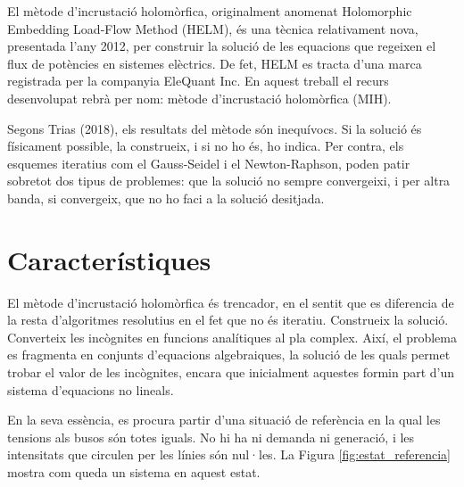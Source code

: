 El mètode d'incrustació holomòrfica, originalment anomenat Holomorphic Embedding Load-Flow Method (HELM), és una tècnica relativament nova, presentada l'any 2012, per construir la solució de les equacions que regeixen el flux de potències en sistemes elèctrics. De fet, HELM es tracta d'una marca registrada per la companyia EleQuant Inc. En aquest treball el recurs desenvolupat rebrà per nom: mètode d'incrustació holomòrfica (MIH).

Segons Trias (2018), els resultats del mètode són inequívocs. Si la solució és físicament possible, la construeix, i si no ho és, ho indica. Per contra, els esquemes iteratius com el Gauss-Seidel i el Newton-Raphson, poden patir sobretot dos tipus de problemes: que la solució no sempre convergeixi, i per altra banda, si convergeix, que no ho faci a la solució desitjada. 

\section{Característiques}
El mètode d'incrustació holomòrfica és trencador, en el sentit que es diferencia de la resta d'algoritmes resolutius en el fet que no és iteratiu. Construeix la solució. Converteix les incògnites en funcions analítiques al pla complex. Així, el problema es fragmenta en conjunts d'equacions algebraiques, la solució de les quals permet trobar el valor de les incògnites, encara que inicialment aquestes formin part d'un sistema d'equacions no lineals. 

En la seva essència, es procura partir d'una situació de referència en la qual les tensions als busos són totes iguals. No hi ha ni demanda ni generació, i les intensitats que circulen per les línies són nul·les. La Figura \ref{fig:estat_referencia} mostra com queda un sistema en aquest estat.

